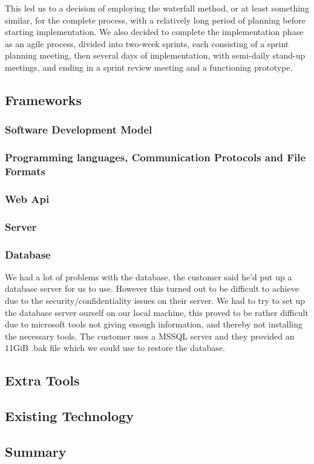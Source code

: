 This led us to a decision of employing the waterfall method, or at least something similar, for the complete process, with a relatively long period of planning before starting implementation. We also decided to complete the implementation phase as an agile process, divided into two-week sprints, each consisting of a sprint planning meeting, then several days of implementation, with semi-daily stand-up meetings, and ending in a sprint review meeting and a functioning prototype.
\subsection{Frameworks}
\subsubsection{Software Development Model}
\subsubsection{Programming languages, Communication Protocols and File Formats}
\subsubsection{Web Api}
\subsubsection{Server}
\subsubsection{Database}
We had a lot of problems with the database, the customer said he'd put up a database server for us to use. However this turned out to be difficult to achieve due to the security/confidentiality issues on their server. We had to try to set up the database server ourself on our local machine, this proved to be rather difficult due to microsoft tools not giving enough information, and thereby not installing the necessary tools.     
The customer uses a MSSQL server and they provided an 11GiB .bak file which we could use to restore the database.
\subsection{Extra Tools}
\subsection{Existing Technology}


\subsection{Summary}